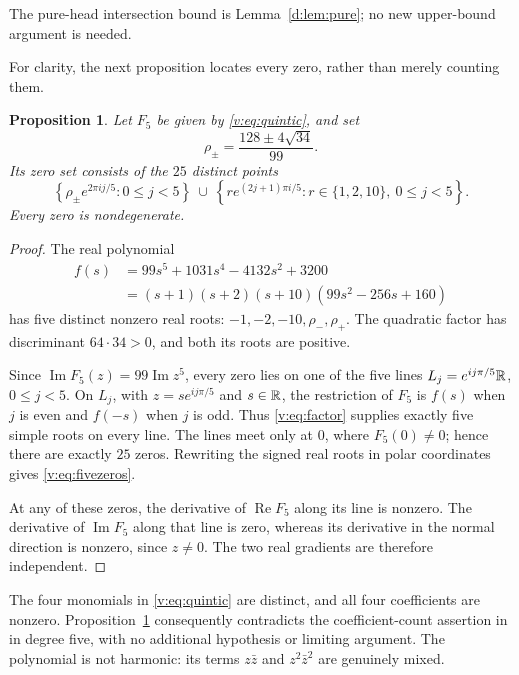 \documentclass[UTF8,11pt]{ctexart}
\newtheorem{prop}[thm]{Proposition}
\theoremstyle{definition}
\numberwithin{equation}{section}
\DeclareMathOperator{\Rea}{Re}\DeclareMathOperator{\Ima}{Im}
\begin{document}
The pure-head intersection bound is Lemma~\ref{d:lem:pure};
no new upper-bound argument is needed.

For clarity, the next proposition locates every zero, rather than merely
counting them.
\begin{prop}\label{v:prop:five}
Let $F_5$ be given by \eqref{v:eq:quintic}, and set
\[
 \rho_\pm=\frac{128\pm4\sqrt{34}}{99}.
\]
Its zero set consists of the $25$ distinct points
\begin{equation}\label{v:eq:fivezeros}
 \left\{\rho_\pm e^{2\pi i j/5}:0\le j<5\right\}
 \ \cup\
 \left\{r e^{(2j+1)\pi i/5}:r\in\{1,2,10\},\ 0\le j<5\right\}.
\end{equation}
Every zero is nondegenerate.
\end{prop}
\begin{proof}
The real polynomial
\begin{equation}\label{v:eq:factor}
 \begin{split}
 f(s)&=99s^5+1031s^4-4132s^2+3200\\
     &=(s+1)(s+2)(s+10)(99s^2-256s+160)
 \end{split}
\end{equation}
has five distinct nonzero real roots: $-1,-2,-10,\rho_-,\rho_+$.
The quadratic factor has discriminant $64\cdot34>0$, and both its
roots are positive.

Since $\Ima F_5(z)=99\Ima z^5$, every zero lies on one of the five
lines $L_j=e^{ij\pi/5}\mathbb R$, $0\le j<5$. On $L_j$, with
$z=s e^{ij\pi/5}$ and $s\in\mathbb R$, the restriction of $F_5$ is $f(s)$
when $j$ is even and $f(-s)$ when $j$ is odd.
Thus \eqref{v:eq:factor} supplies exactly five simple roots on every line.
The lines meet only at $0$, where $F_5(0)\ne0$; hence there are exactly
$25$ zeros. Rewriting the signed real roots in polar coordinates gives
\eqref{v:eq:fivezeros}.

At any of these zeros, the derivative of $\Rea F_5$ along its line is
nonzero. The derivative of $\Ima F_5$ along that line is zero, whereas
its derivative in the normal direction is nonzero, since $z\ne0$.
The two real gradients are therefore independent.
\end{proof}

The four monomials in \eqref{v:eq:quintic} are distinct, and all four
coefficients are nonzero. Proposition~\ref{v:prop:five} consequently
contradicts the coefficient-count assertion in
\cite[Remark~4.4, p.~16]{SZ24} in degree five, with no additional
hypothesis or limiting argument. The polynomial is not harmonic:
its terms $z\bar z$ and $z^2\bar z^2$ are genuinely mixed.
\end{document}
